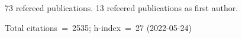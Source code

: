 73 refereed publications. 13 refeered publications as first author.

Total citations~=~2535; h-index~=~27 (2022-05-24)